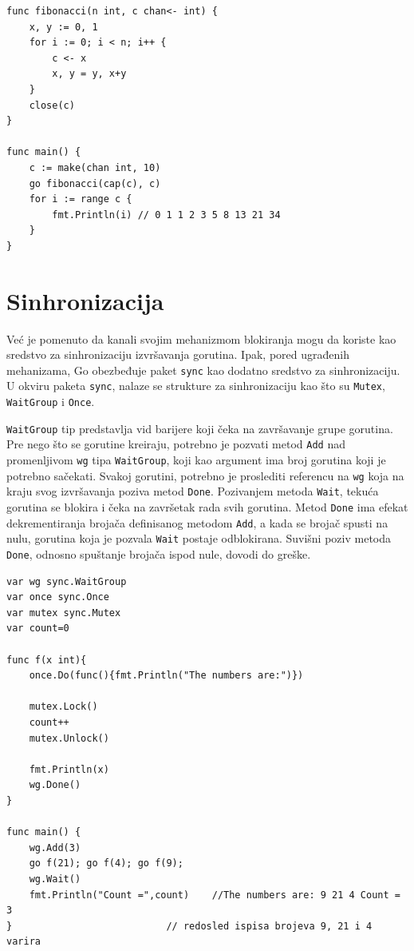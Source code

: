 \documentclass[12pt,oneside]{memoir}
\begin{document}
\begin{center}
\begin{lstlisting}[caption=Primer upotrebe jednosmernog kanala i kanala sa baferom, label={lst:chan2},  backgroundcolor=\color{background}]
func fibonacci(n int, c chan<- int) {
	x, y := 0, 1
	for i := 0; i < n; i++ {
		c <- x
		x, y = y, x+y
	}
	close(c)
}

func main() {
	c := make(chan int, 10)
	go fibonacci(cap(c), c)
	for i := range c {
		fmt.Println(i) // 0 1 1 2 3 5 8 13 21 34
	}
}
\end{lstlisting}
\end{center}

\section{Sinhronizacija}

Već je pomenuto da kanali svojim mehanizmom blokiranja mogu da koriste kao sredstvo za sinhronizaciju izvršavanja gorutina. Ipak, pored ugrađenih mehanizama, Go obezbeđuje paket \texttt{sync} kao dodatno sredstvo za sinhronizaciju. U okviru paketa \texttt{sync}, nalaze se strukture za sinhronizaciju kao što su \texttt{Mutex}, \texttt{WaitGroup} i \texttt{Once}.

\texttt{WaitGroup} tip predstavlja vid barijere koji čeka na završavanje grupe gorutina. Pre nego što se gorutine kreiraju, potrebno je pozvati metod \texttt{Add} nad promenljivom \texttt{wg} tipa \texttt{WaitGroup}, koji kao argument ima broj gorutina koji je potrebno sačekati. Svakoj gorutini, potrebno je proslediti referencu na \texttt{wg} koja na kraju svog izvršavanja poziva metod \texttt{Done}. Pozivanjem metoda \texttt{Wait}, tekuća gorutina se blokira i čeka na završetak rada svih gorutina.  Metod \texttt{Done} ima efekat dekrementiranja brojača definisanog metodom \texttt{Add}, a kada se brojač spusti na nulu, gorutina koja je pozvala \texttt{Wait} postaje odblokirana. Suvišni poziv metoda \texttt{Done}, odnosno spuštanje brojača ispod nule, dovodi do greške. 

\begin{center}
\begin{lstlisting}[caption=Primer upotrebe \texttt{sync} paketa za sinhronizaciju, label={lst:sync},  backgroundcolor=\color{background}]
var wg sync.WaitGroup
var once sync.Once
var mutex sync.Mutex
var count=0

func f(x int){
	once.Do(func(){fmt.Println("The numbers are:")})
	
	mutex.Lock()
	count++
	mutex.Unlock()
	
	fmt.Println(x)
	wg.Done()
}

func main() {
	wg.Add(3)
	go f(21); go f(4); go f(9);	
	wg.Wait()
	fmt.Println("Count =",count)	//The numbers are: 9 21 4 Count = 3 
}							// redosled ispisa brojeva 9, 21 i 4 varira
\end{lstlisting}
\end{center}
\end{document}
